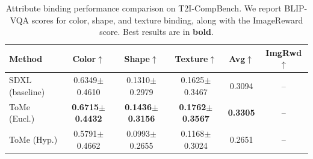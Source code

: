 \begin{table}[t]
\centering
\caption{Attribute binding performance comparison on T2I-CompBench. We report BLIP-VQA scores for color, shape, and texture binding, along with the ImageReward score. Best results are in \textbf{bold}.}
\label{tab:main_comparison}
\begin{tabular}{l|ccc|c|c}
\toprule
Method & Color$\uparrow$ & Shape$\uparrow$ & Texture$\uparrow$ & Avg$\uparrow$ & ImgRwd$\uparrow$ \\
\midrule
SDXL (baseline) & 0.6349$\pm$0.4610 & 0.1310$\pm$0.2979 & 0.1625$\pm$0.3467 & 0.3094 & -- \\
ToMe (Eucl.) & \textbf{0.6715$\pm$0.4432} & \textbf{0.1436$\pm$0.3156} & \textbf{0.1762$\pm$0.3567} & \textbf{0.3305} & -- \\
ToMe (Hyp.) & 0.5791$\pm$0.4662 & 0.0993$\pm$0.2655 & 0.1168$\pm$0.3024 & 0.2651 & -- \\
\bottomrule
\end{tabular}
\end{table}